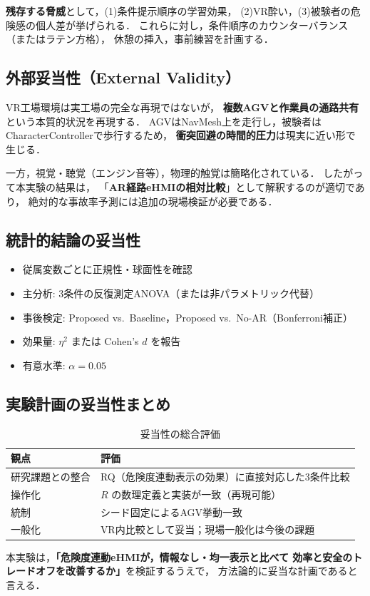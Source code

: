 \textbf{残存する脅威}として，(1)条件提示順序の学習効果，
(2)VR酔い，(3)被験者の危険感の個人差が挙げられる．
これらに対し，条件順序のカウンターバランス（またはラテン方格），
休憩の挿入，事前練習を計画する．

\subsection{外部妥当性（External Validity）}

VR工場環境は実工場の完全な再現ではないが，
\textbf{複数AGVと作業員の通路共有}という本質的状況を再現する．
AGVはNavMesh上を走行し，被験者はCharacterControllerで歩行するため，
\textbf{衝突回避の時間的圧力}は現実に近い形で生じる．

一方，視覚・聴覚（エンジン音等），物理的触覚は簡略化されている．
したがって本実験の結果は，
「\textbf{AR経路eHMIの相対比較}」として解釈するのが適切であり，
絶対的な事故率予測には追加の現場検証が必要である．

\subsection{統計的結論の妥当性}

\begin{itemize}[leftmargin=2em]
  \item 従属変数ごとに正規性・球面性を確認
  \item 主分析: 3条件の反復測定ANOVA（または非パラメトリック代替）
  \item 事後検定: Proposed vs.\ Baseline，Proposed vs.\ No-AR（Bonferroni補正）
  \item 効果量: $\eta^2$ または Cohen's $d$ を報告
  \item 有意水準: $\alpha = 0.05$
\end{itemize}

\subsection{実験計画の妥当性まとめ}

\begin{table}[htbp]
  \centering
  \caption{妥当性の総合評価}
  \label{tab:validity_summary}
  \begin{tabular}{p{3.2cm}p{9.5cm}}
    \toprule
    観点 & 評価 \\
    \midrule
    研究課題との整合 & RQ（危険度連動表示の効果）に直接対応した3条件比較 \\
    操作化 & $R$ の数理定義と実装が一致（再現可能） \\
    統制 & シード固定によるAGV挙動一致 \\
    一般化 & VR内比較として妥当；現場一般化は今後の課題 \\
    \bottomrule
  \end{tabular}
\end{table}

本実験は，\textbf{「危険度連動eHMIが，情報なし・均一表示と比べて
効率と安全のトレードオフを改善するか」}を検証するうえで，
方法論的に妥当な計画であると言える．
